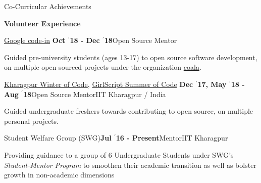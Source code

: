 \documentclass{resume} %
\begin{document}
\begin{rSection}{Co-Curricular Achievements}


\vspace{-0.9em}
{\large {\textbf{Volunteer Experience}}

\begin{rSubsection}{\large \href{https://codein.withgoogle.com/}{Google code-in}}{\textbf{ Oct $^{\prime}$18 - Dec $^{\prime}$18}}{Open Source Mentor}{}
\item Guided pre-university students (ages 13-17) to open source software development, on multiple open sourced projects under the organization \href{http://coala.io}{coala}.
\end{rSubsection}

\vspace{-0.5em}
\begin{rSubsection}{\large \href{https://kwoc.kossiitkgp.in/}{Kharagpur Winter of Code}, \href{https://gssoc.tech/projects.html\#facebook-archive}{GirlScript Summer of Code}}{\textbf{ Dec $^{\prime}$17, May $^{\prime}$18 - Aug $^{\prime}$18}}{Open Source Mentor}{IIT Kharagpur / India}
\item Guided undergraduate freshers towards contributing to open source, on multiple personal projects.
\end{rSubsection}

\vspace{-0.5em}
\begin{rSubsection}{\large {\color{mypurple} Student Welfare Group (SWG)}}{\textbf{\large Jul $^{\prime}$16 - Present}}{Mentor}{IIT Kharagpur}
\item Providing guidance to a group of 6 Undergraduate Students under SWG's \textit{Student-Mentor Program} to smoothen their academic transition as well as bolster growth in non-academic dimensions
\end{rSubsection}

}
\end{rSection}
\end{document}
